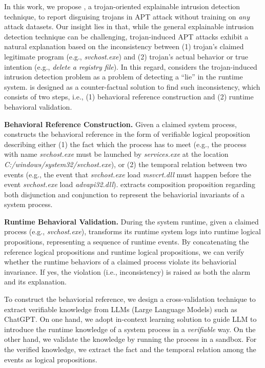 In this work, we propose \tool,
a trojan-oriented explainable intrusion detection technique,
to report disguising trojans in APT attack without training on \textit{any} attack datasets.
Our insight lies in that,
while the general explainable intrusion detection technique can be challenging,
trojan-induced APT attacks exhibit a natural explanation based on
the inconsistency between 
(1) trojan's claimed legitimate program (e.g., \textit{svchost.exe}) and
(2) trojan's actual behavior or true intention (e.g., \textit{delete a registry file}).
In this regard, 
\tool considers the trojan-induced intrusion detection problem as a problem of
detecting a ``lie'' in the runtime system.
\tool is designed as a counter-factual solution to find such inconsistency,
which consists of two steps, i.e., 
(1) behavioral reference construction and
(2) runtime behavioral validation.

\noindent\textbf{Behavioral Reference Construction.}
Given a claimed system process, \tool constructs the behavioral reference in the form of 
verifiable logical proposition describing either
(1) the fact which the process has to meet (e.g., the process with name \textit{svchost.exe} must be launched by \textit{services.exe} at the location \textit{C:/windows/system32/svchost.exe}), or
(2) the temporal relation between two events 
(e.g., the event that \textit{svchost.exe} load \textit{msvcrt.dll} must happen before the event \textit{svchost.exe} load \textit{advapi32.dll}).
\tool extracts composition proposition regarding both disjunction and conjunction
to represent the behaviorial invariants of a system process.

\noindent\textbf{Runtime Behavioral Validation.}
During the system runtime,
given a claimed process (e.g., \textit{svchost.exe}),
\tool transforms its runtime system logs into runtime logical propositions, 
representing a sequence of runtime events.
By concatenating the reference logical propositions and runtime logical propositions,
we can verify whether the runtime behaviors of a claimed process violate its behaviorial invariance.
If yes, the violation (i.e., inconsistency) is raised as both the alarm and its explanation.


To construct the behaviorial reference, 
we design a cross-validation technique to extract verifiable knowledge from LLMs (Large Language Models) such as ChatGPT.
On one hand, 
we adopt in-context learning solution to guide LLM to 
introduce the runtime knowledge of a system process in a \textit{verifiable} way.
On the other hand,
we validate the knowledge by running the process in a sandbox.
For the verified knowledge,
we extract the fact and the temporal relation among the events
as logical propositions.


